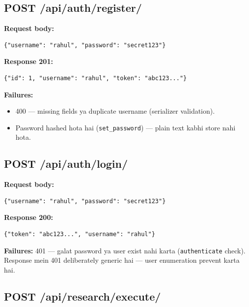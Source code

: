 \subsection{POST /api/auth/register/}

\begin{codestorybox}
\textbf{Request body:}
\begin{lstlisting}[style=jsonstyle]
{"username": "rahul", "password": "secret123"}
\end{lstlisting}

\textbf{Response 201:}
\begin{lstlisting}[style=jsonstyle]
{"id": 1, "username": "rahul", "token": "abc123..."}
\end{lstlisting}

\textbf{Failures:}
\begin{itemize}
\item 400 --- missing fields ya duplicate username (serializer validation).
\item Password hashed hota hai (\texttt{set\_password}) --- plain text kabhi store nahi hota.
\end{itemize}
\end{codestorybox}

\subsection{POST /api/auth/login/}

\begin{codestorybox}
\textbf{Request body:}
\begin{lstlisting}[style=jsonstyle]
{"username": "rahul", "password": "secret123"}
\end{lstlisting}

\textbf{Response 200:}
\begin{lstlisting}[style=jsonstyle]
{"token": "abc123...", "username": "rahul"}
\end{lstlisting}

\textbf{Failures:} 401 --- galat password ya user exist nahi karta (\texttt{authenticate} check). Response mein 401 deliberately generic hai --- user enumeration prevent karta hai.
\end{codestorybox}

\subsection{POST /api/research/execute/}

